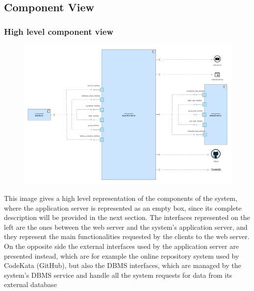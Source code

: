 \documentclass[../DD.tex]{subfiles}
\begin{document}
    \newpage
    \subsection{Component View}\label{subsec:component_view}
        \subsubsection*{High level component view}
        \begin{figure}[ht]
            \centering
            \hspace*{-3.5cm}
            \includegraphics[width=1.4\textwidth]{../assets/section_2/HighLevelComponentDiagram.png}
        \end{figure}
        This image gives a high level representation of the components of the system, where the application server is represented as an empty box, since its complete description will be provided in the next section. The interfaces represented on the left are the ones between the web server and the system's application server, and they represent the main functionalities requested by the clients to the web server. On the opposite side the external interfaces used by the application server are presented instead, which are for example the online repository system used by CodeKata (GitHub), but also the DBMS interfaces, which are managed by the system's DBMS service and handle all the system requests for data from its external database
    \newpage
    \restoregeometry

\end{document}

